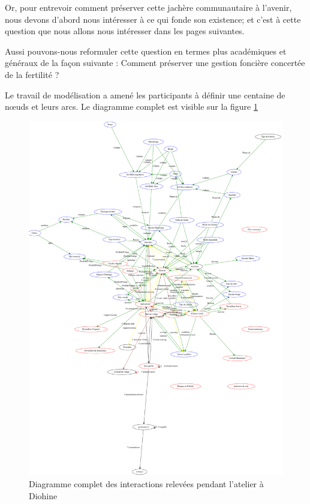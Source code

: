 Or, pour entrevoir comment préserver cette jachère communautaire à l'avenir, nous devons d'abord nous intéresser à ce qui fonde son existence; et c'est à cette question que nous allons nous intéresser dans les pages suivantes.


Aussi pouvons-nous reformuler cette question en termes plus académiques et généraux de la façon suivante :
Comment préserver une gestion foncière concertée de la fertilité ?



Le travail de modélisation a amené les participants à définir une centaine de nœuds et leurs arcs. Le diagramme complet est visible sur la figure \ref{diagComplet}


\begin{figure}
  \begin{center}
  \includegraphics[width=15cm]{img/pardi_fdp.png}
  \end{center}
  \caption{Diagramme complet des interactions relevées pendant l'atelier à Diohine }
  \label{diagComplet}
\end{figure}

